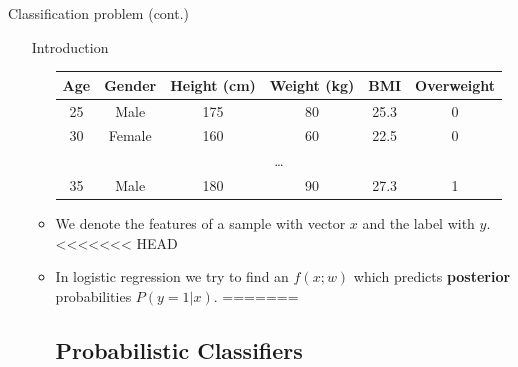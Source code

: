 \documentclass[serif, aspectratio=169]{beamer}
\begin{document}
\begin{frame}{Classification problem (cont.)}
\begin{itemize}
\begin{frame}{Introduction}
\begin{itemize}
        
        \begin{table}[h!]
        \centering
        \begin{tabular}{|c|c|c|c|c|c|}
        \hline
        \textcolor{deepred}{Age} & \textcolor{deepred}{Gender} & \textcolor{deepred}{Height (cm)} & \textcolor{deepred}{Weight (kg)} & \textcolor{deepred}{BMI} & \textcolor{deepgreen}{Overweight} \\ \hline
        25 & Male & 175 & 80 & 25.3 & 0 \\ \hline
        30 & Female & 160 & 60 & 22.5 & 0 \\ \hline
        \multicolumn{6}{|c|}{\dots} \\ \hline
        35 & Male & 180 & 90 & 27.3 & 1 \\ \hline
        \end{tabular}
        \end{table}
        \item We denote the \textcolor{deepred}{features} of a sample with vector $x$ and the \textcolor{deepgreen}{label} with $y$.
<<<<<<< HEAD
        \item In logistic regression we try to find an $f(x;w)$ which predicts \textbf{posterior} probabilities $P(y=1|x)$.
=======
\subsection{Probabilistic Classifiers}


\end{itemize}
\end{frame}
\end{itemize}
\end{frame}
\end{document}
